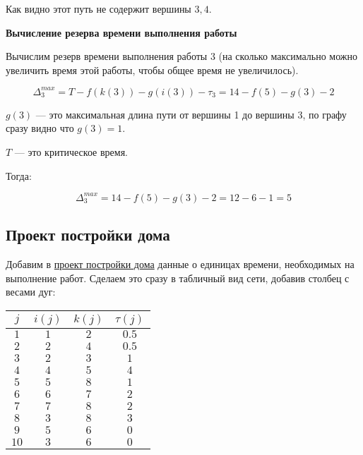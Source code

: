 Как видно этот путь не содержит вершины $3, 4$.

\bigskip

\textbf{Вычисление резерва времени выполнения работы}

Вычислим резерв времени выполнения работы 3 (на сколько максимально можно увеличить время этой работы, чтобы общее время не увеличилось).

\[
\Delta^{max}_3 = T - f(k(3)) - g(i(3)) - \tau_3 = 14 - f(5) - g(3) - 2
\]

$g(3)$ --- это максимальная длина пути от вершины 1 до вершины 3, по графу сразу видно что $g(3) = 1$.

$T$ --- это критическое время.

\bigskip

Тогда:

\[
\Delta^{max}_3 = 14 - f(5) - g(3) -2 = 12 - 6 - 1 = 5
\]

\bigskip

\subsection{Проект постройки дома}

Добавим в \hyperref[proj:house_building_project]{проект постройки дома} данные о единицах времени, необходимых на выполнение работ. Сделаем это сразу в табличный вид сети, добавив столбец с весами дуг:

\begin{table}[H]
	\centering
	\begin{tabular}{ | c | c | c | c |} 
		\hline
		$j$ & $i(j)$ & $k(j)$ & $\tau(j)$ \\ \hline
		
		$1$ & $1$ & $2$ & $0.5$ \\ \hline
		$2$ & $2$ & $4$ & $0.5$ \\ \hline
		$3$ & $2$ & $3$ & $1$ \\ \hline
		$4$ & $4$ & $5$ & $4$ \\ \hline
		$5$ & $5$ & $8$ & $1$ \\ \hline
		$6$ & $6$ & $7$ & $2$ \\ \hline
		$7$ & $7$ & $8$ & $2$ \\ \hline
		$8$ & $3$ & $8$ & $3$ \\ \hline
		$9$ & $5$ & $6$ & $0$ \\ \hline
		$10$ & $3$ & $6$ & $0$ \\ \hline
	\end{tabular}
\end{table}

